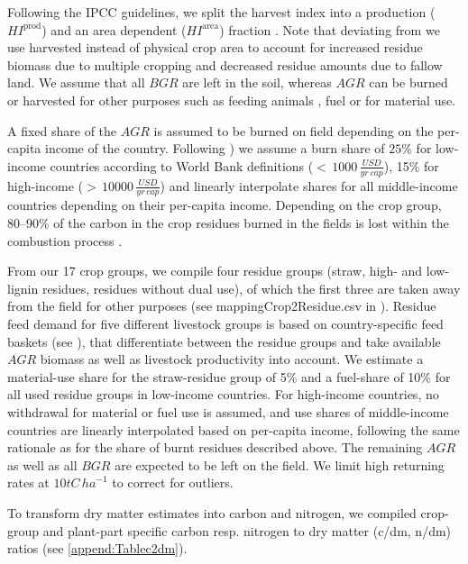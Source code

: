 \documentclass[gc, manuscript]{copernicus}
\begin{document}
Following the IPCC guidelines, we split the harvest index into a production (\(HI^{\mathrm{prod}}\)) and an area dependent (\(HI^{\mathrm{area}}\)) fraction \citep{eggleston_hs_ipcc_2006}. Note that deviating from \citep{bodirsky_n2o_2012} we use harvested instead of physical crop area to account for increased residue biomass due to multiple cropping and decreased residue amounts due to fallow land. We assume that all \(BGR\) are left in the soil, whereas \(AGR\) can be burned or harvested for other purposes such as feeding animals \citep{weindl_livestock_2017}, fuel or for material use.

A fixed share of the \(AGR\) is assumed to be burned on field depending on the per-capita income of the country. Following \citep{smil_nitrogen_1999}) we assume a burn share of \(25\%\) for low-income countries according to World Bank definitions (\(<\,1000\,\tfrac{USD}{yr\,cap}\)), 15\% for high-income (\(>\,10000\,\tfrac{USD}{yr\,cap}\)) and linearly interpolate shares for all middle-income countries depending on their per-capita income. Depending on the crop group, 80--90\% of the carbon in the crop residues burned in the fields is lost within the combustion process \citep{eggleston_hs_ipcc_2006}.

From our 17 crop groups, we compile four residue groups (straw, high- and low-lignin residues, residues without dual use), of which the first three are taken away from the field for other purposes (see mappingCrop2Residue.csv in \citep{mrcommons}). Residue feed demand for five different livestock groups is based on country-specific feed baskets (see \citep{weindl_livestock_2017}), that differentiate between the residue groups and take available \(AGR\) biomass as well as livestock productivity into account. We estimate a material-use share for the straw-residue group of 5\% and a fuel-share of 10\% for all used residue groups in low-income countries. For high-income countries, no withdrawal for material or fuel use is assumed, and use shares of middle-income countries are linearly interpolated based on per-capita income, following the same rationale as for the share of burnt residues described above. The remaining \(AGR\) as well as all \(BGR\) are expected to be left on the field. We limit high returning rates at \(10\unit{tC\,ha}^{-1}\) to correct for outliers.

To transform dry matter estimates into carbon and nitrogen, we compiled crop-group and plant-part specific carbon resp. nitrogen to dry matter (c/dm, n/dm) ratios (see \ref{append:Tablec2dm}).
\end{document}

